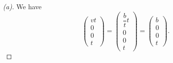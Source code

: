 \begin{proof}[(a)]
  We have
  \[
    \begin{pmatrix}
      vt \\
      0  \\
      0  \\
      t
    \end{pmatrix} = \begin{pmatrix}
      \dfrac{b}{t} t \\
      0              \\
      0              \\
      t
    \end{pmatrix} = \begin{pmatrix}
      b \\
      0 \\
      0 \\
      t
    \end{pmatrix}.
  \]
\end{proof}

